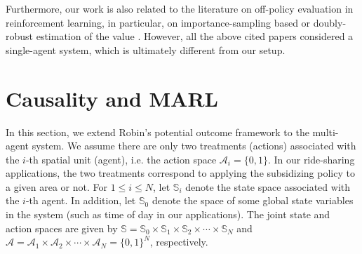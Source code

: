 \documentclass{article}
\begin{document}
Furthermore, our work is also related to the literature on off-policy evaluation in reinforcement learning, in particular, on importance-sampling based or doubly-robust estimation of the value \citep[see e.g.,][]{thomas2015,jiang2016,liu2018,kallus2019efficiently,uehara2019minimax,tang2019doubly}. However, all the above cited papers considered a single-agent system, which is ultimately different from our setup.\vspace{-0.3cm}

\section{Causality and MARL}\label{sec:causalMARL}\vspace{-0.2cm}
In this section, we extend Robin's potential outcome framework to the multi-agent system. We assume there are only two treatments (actions) associated with the $i$-th spatial unit (agent), i.e. the action space $\mathcal{A}_i=\{0,1\}$. In our ride-sharing applications, the two treatments correspond to applying the subsidizing policy to a given area or not. For $1\le i\le N$, let $\mathbb{S}_i$ denote the state space associated with the $i$-th agent. In addition, let $\mathbb{S}_0$ denote the space of some global state variables in the system (such as time of day in our applications). The joint state and action spaces are given by $\mathbb{S}=\mathbb{S}_0 \times \mathbb{S}_1 \times \mathbb{S}_2 \times \cdots \times \mathbb{S}_N$ and $\mathcal{A}=\mathcal{A}_1\times \mathcal{A}_2 \times  \cdots \times \mathcal{A}_N=\{0,1\}^N$, respectively. 
\end{document}
